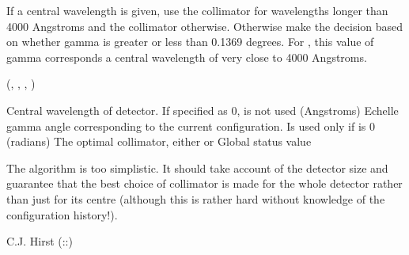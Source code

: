 \begin{manroutinedescription}
     If a central wavelength is given, use the {} collimator for %
wavelengths
     longer than 4000 Angstroms and the {} collimator otherwise. %
Otherwise
     make the decision based on whether gamma is greater or less than 0.1369
     degrees. For {}, this value of gamma corresponds a central %
wavelength
     of very close to 4000 Angstroms.

     {} {} ({}, {},%
 {}, {})

\begin{manparametertable}
Central wavelength of detector. If
                                      specified as {\mantt{<=}} 0, is not used
                                      (Angstroms)
Echelle gamma angle corresponding to the
                                      current configuration. Is used only if
                                      {} is {\mantt{<=}} 0
                                      (radians)
The optimal collimator, either {} or {}
 Global status value
\end{manparametertable}
     The algorithm is too simplistic. It should take account of the detector
     size and guarantee that the best choice of collimator is made for the
     whole detector rather than just for its centre (although this is rather
     hard without knowledge of the configuration history!).

     C.J. Hirst  {}  ({}::{})

\end{manroutinedescription}
